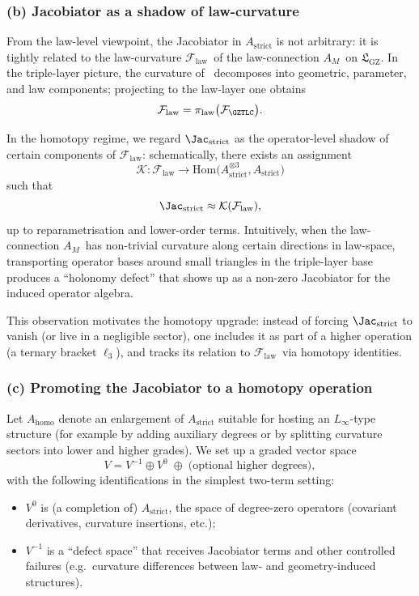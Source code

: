 \documentclass[11pt]{book}
\theoremstyle{plain}
\theoremstyle{definition}
\newcommand{\GZLS}{\ensuremath{\mathfrak{L}_{\mathrm{GZ}}}}       \newcommand{\GZLT}{\ensuremath{M_{!w}}}                           \newcommand{\GZLOC}{\ensuremath{A_M}}                             \newcommand{\GZLCurv}{\ensuremath{\mathcal{F}_{\mathrm{law}}}}
\begin{document}
\subsubsection*{(b) Jacobiator as a shadow of law-curvature}

From the law-level viewpoint, the Jacobiator in
$A_{\mathrm{strict}}$ is not arbitrary: it is tightly related to the
law-curvature \GZLCurv\ of the law-connection \GZLOC\ on \GZLS. In the
triple-layer picture, the curvature of \GZTLC\ decomposes into
geometric, parameter, and law components; projecting to the law-layer
one obtains
\[
   \GZLCurv
   =
   \pi_{\mathrm{law}}\bigl(\mathcal{F}_{\GZTLC}\bigr).
\]

In the homotopy regime, we regard $\Jac_{\mathrm{strict}}$ as the
operator-level shadow of certain components of \GZLCurv: schematically,
there exists an assignment
\[
   \mathcal{K}:
     \GZLCurv
     \longrightarrow
     \mathrm{Hom}\bigl(
       A_{\mathrm{strict}}^{\otimes3},A_{\mathrm{strict}}
     \bigr)
\]
such that
\[
   \Jac_{\mathrm{strict}}
   \approx
   \mathcal{K}(\GZLCurv),
\]
up to reparametrisation and lower-order terms. Intuitively, when the
law-connection \GZLOC\ has non-trivial curvature along certain
directions in law-space, transporting operator bases around small
triangles in the triple-layer base produces a “holonomy defect” that
shows up as a non-zero Jacobiator for the induced operator algebra.

This observation motivates the homotopy upgrade: instead of forcing
$\Jac_{\mathrm{strict}}$ to vanish (or live in a negligible sector),
one includes it as part of a higher operation (a ternary bracket
$\ell_3$), and tracks its relation to \GZLCurv\ via homotopy identities.



\subsubsection*{(c) Promoting the Jacobiator to a homotopy operation}

Let $A_{\mathrm{homo}}$ denote an enlargement of $A_{\mathrm{strict}}$
suitable for hosting an $L_\infty$-type structure (for example by
adding auxiliary degrees or by splitting curvature sectors into lower
and higher grades). We set up a graded vector space
\[
   V
   =
   V^{-1}\oplus V^0
   \;\oplus\;\text{(optional higher degrees)},
\]
with the following identifications in the simplest two-term setting:

\begin{itemize}
  \item $V^0$ is (a completion of) $A_{\mathrm{strict}}$, the space of
        degree-zero operators (covariant derivatives, curvature
        insertions, etc.);
  \item $V^{-1}$ is a “defect space” that receives Jacobiator terms
        and other controlled failures (e.g.\ curvature differences
        between law- and geometry-induced structures).
\end{itemize}
\end{document}
